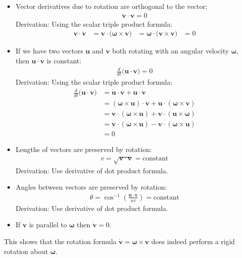 \documentclass{article}
\renewcommand{\vec}[1]{\boldsymbol{#1}}
\begin{document}
\begin{itemize}
\item Vector derivatives due to rotation are orthogonal to the vector:
  \begin{align}
    \dot{\vec{v}} \cdot \vec{v} = 0
  \end{align}
  Derivation: Using the scalar triple product formula:
  \begin{align}
    \vec{v} \cdot \dot{\vec{v}}
    &= \vec{v} \cdot \big( \vec{\omega} \times \vec{v} \big)
    &= \vec{\omega} \cdot \big( \vec{v} \times \vec{v} \big)
    &= 0
  \end{align}
\item If we have two vectors $\vec{u}$ and $\vec{v}$ both rotating
  with an angular velocity $\vec{\omega}$, then $\vec{u} \cdot
  \vec{v}$ is constant:
  \begin{align}
    \frac{d}{dt} \big( \vec{u} \cdot \vec{v} \big) = 0
  \end{align}
  Derivation: Using the scalar triple product formula:
  \begin{align}
    \frac{d}{dt} \big( \vec{u} \cdot \vec{v} \big)
    &= \dot{\vec{u}} \cdot \vec{v} + \vec{u} \cdot \dot{\vec{v}} \\
    &= (\vec{\omega} \times \vec{u}) \cdot \vec{v}
    + \vec{u} \cdot (\vec{\omega} \times \vec{v}) \\
    &= \vec{v} \cdot (\vec{\omega} \times \vec{u})
    + \vec{v} \cdot (\vec{u} \times \vec{\omega}) \\
    &= \vec{v} \cdot (\vec{\omega} \times \vec{u})
    - \vec{v} \cdot (\vec{\omega} \times \vec{u}) \\
    &= 0
  \end{align}
\item Lengths of vectors are preserved by rotation:
  \begin{align}
    v = \sqrt{\vec{v} \cdot \vec{v}} = \text{constant}
  \end{align}
  Derivation: Use derivative of dot product formula.
\item Angles between vectors are preserved by rotation:
  \begin{align}
    \theta
    = \cos^{-1}\left(\frac{\vec{u} \cdot \vec{v}}{u v}\right)
    = \text{constant}
  \end{align}
  Derivation: Use derivative of dot product formula.
\item If $\vec{v}$ is parallel to $\vec{\omega}$ then $\dot{\vec{v}} =
  0$.
\end{itemize}
This shows that the rotation formula $\dot{\vec{v}} = \vec{\omega}
\times \vec{v}$ does indeed perform a rigid rotation about
$\vec{\omega}$.
\end{document}
